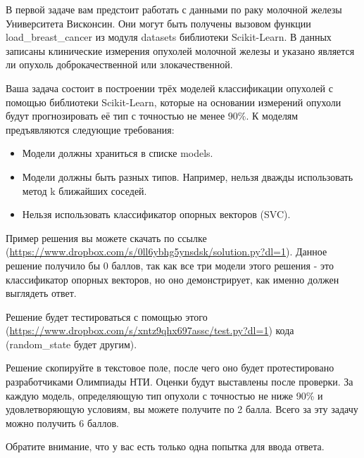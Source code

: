 
В первой задаче вам предстоит работать с данными по раку молочной железы Университета Висконсин. 
Они могут быть получены вызовом функции \linebreak load\_breast\_cancer из модуля datasets библиотеки Scikit-Learn. 
В данных записаны клинические измерения опухолей молочной железы и указано является ли опухоль 
доброкачественной или злокачественной.

Ваша задача состоит в построении трёх моделей классификации опухолей с помощью библиотеки Scikit-Learn, 
которые на основании измерений опухоли будут прогнозировать её тип с точностью не менее $90\%$. 
К моделям предъявляются следующие требования:

\begin{itemize}
    \item Модели должны храниться в списке models.
    \item Модели должны быть разных типов. Например, нельзя дважды использовать метод k ближайших соседей.
    \item Нельзя использовать классификатор опорных векторов (SVC).
\end{itemize}

Пример решения вы можете скачать по ссылке (\url{https://www.dropbox.com/s/0ll6ybhg5ynsdsk/solution.py?dl=1}).  Данное решение получило бы 0 баллов, так как все три модели этого решения - это классификатор опорных векторов, но оно демонстрирует, как именно должен выглядеть ответ.

Решение будет тестироваться с помощью этого (\url{https://www.dropbox.com/s/xntz9qhx697assc/test.py?dl=1}) кода (random\_state будет другим).

Решение скопируйте в текстовое поле, после чего оно будет протестировано разработчиками Олимпиады НТИ. Оценки будут выставлены после проверки. За каждую модель, определяющую тип опухоли с точностью не ниже 90\% и удовлетворяющую условиям, вы можете получите по 2 балла. Всего за эту задачу можно получить 6 баллов. 

Обратите внимание, что у вас есть только одна попытка для ввода ответа.


